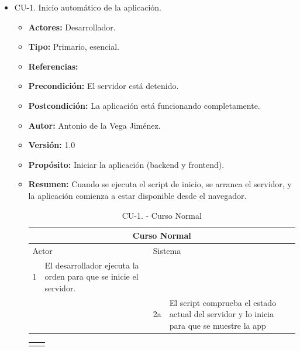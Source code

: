 \begin{itemize}
  \item CU-1. Inicio automático de la aplicación.
  \begin{itemize}
    \item \textbf{Actores:} Desarrollador.
    \item \textbf{Tipo:} Primario, esencial.
    \item \textbf{Referencias:}
    \item \textbf{Precondición:} El servidor está detenido.
    \item \textbf{Postcondición:} La aplicación está funcionando completamente.
    \item \textbf{Autor:} Antonio de la Vega Jiménez.
    \item \textbf{Versión:} 1.0
    \item \textbf{Propósito:} Iniciar la aplicación (backend y frontend).
    \item \textbf{Resumen:} Cuando se ejecuta el script de inicio, se arranca el servidor, y la aplicación comienza a estar disponible desde el navegador.
    \begin{table}[H]
      \centering
      \begin{tabularx}{\textwidth}{|l|X|l|X|}
        \hline
        \multicolumn{4}{|c|}{\cellcolor[HTML]{C0C0C0}Curso Normal}                                                 \\ \hline
        \multicolumn{2}{|l|}{\cellcolor[HTML]{EFEFEF}Actor} & \multicolumn{2}{l|}{\cellcolor[HTML]{EFEFEF}Sistema} \\ \hline
        1                         & El desarrollador ejecuta la orden para que se inicie el servidor.                        &                            &                         \\ \hline
                                  &                         & 2a                          & El script comprueba el estado actual del servidor y lo inicia para que se muestre la app                        \\ \hline
      \end{tabularx}
      \caption{CU-1. - Curso Normal}
      \label{table-0}
    \end{table}
    \begin{table}[H]
      \centering
      \begin{tabularx}{\textwidth}{|l|X|}
       \hline
       \rowcolor[HTML]{C0C0C0} 

\end{tabularx}
\end{table}
\end{itemize}
\end{itemize}
